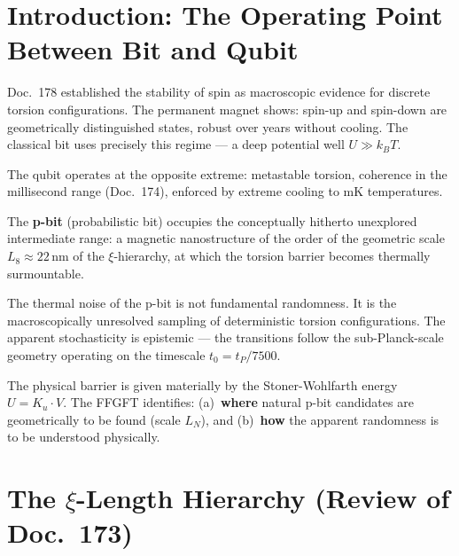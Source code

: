 	\maketitle
	\tableofcontents
	\newpage
	
	\section{Introduction: The Operating Point Between Bit and Qubit}
	\label{sec:introduction}
	
	Doc.~178 established the stability of spin as macroscopic evidence
	for discrete torsion configurations. The permanent magnet shows:
	spin-up and spin-down are geometrically distinguished states, robust over
	years without cooling. The classical bit uses precisely this regime ---
	a deep potential well $U \gg k_B T$.
	
	The qubit operates at the opposite extreme: metastable torsion,
	coherence in the millisecond range (Doc.~174), enforced by
	extreme cooling to mK temperatures.
	
	The \textbf{p-bit} (probabilistic bit) occupies the conceptually
	hitherto unexplored intermediate range: a magnetic nanostructure
	of the order of the geometric scale $L_8 \approx 22\,\text{nm}$ of the
	$\xi$-hierarchy, at which the torsion barrier becomes thermally
	surmountable.
	
	\begin{significance}
		The thermal noise of the p-bit is not fundamental randomness.
		It is the macroscopically unresolved sampling of deterministic
		torsion configurations. The apparent stochasticity is epistemic
		--- the transitions follow the sub-Planck-scale geometry
		operating on the timescale $t_0 = t_P/7500$.
		
		The physical barrier is given materially by the
		Stoner-Wohlfarth energy $U = K_u \cdot V$.
		The FFGFT identifies: (a)~\textbf{where} natural p-bit candidates
		are geometrically to be found (scale $L_N$), and (b)~\textbf{how} the
		apparent randomness is to be understood physically.
	\end{significance}
	
	\section{The \texorpdfstring{$\xi$}{xi}-Length Hierarchy
		(Review of Doc.~173)}
	\label{sec:length-hierarchy}
	
